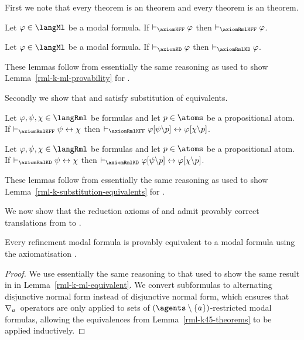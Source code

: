 First we note that every \axiomKFF{} theorem is an \axiomRmlKFF{} theorem and every \axiomKD{} theorem is an \axiomRmlKD{} theorem.

\begin{lemma}\label{rml-k45-ml-provability}
Let $\phi \in \langMl$ be a modal formula.
If $\proves_\axiomKFF \phi$ then $\proves_\axiomRmlKFF \phi$.
\end{lemma}

\begin{lemma}\label{rml-kd45-ml-provability}
Let $\phi \in \langMl$ be a modal formula.
If $\proves_\axiomKD \phi$ then $\proves_\axiomRmlKD \phi$.
\end{lemma}

These lemmas follow from essentially the same reasoning as used to show Lemma~\ref{rml-k-ml-provability} for \axiomRmlK{}.

Secondly we show that \axiomRmlKFF{} and \axiomRmlKD{} satisfy substitution of equivalents.

\begin{lemma}\label{rml-k45-substitution-equivalents}
Let $\phi, \psi, \chi \in \langRml$ be formulas and let $\atomP \in \atoms$ be a propositional atom.
If $\proves_\axiomRmlKFF \psi \iff \chi$ then $\proves_\axiomRmlKFF \phi[\psi\backslash\atomP] \iff \phi[\chi\backslash\atomP]$.
\end{lemma}

\begin{lemma}\label{rml-kd45-substitution-equivalents}
Let $\phi, \psi, \chi \in \langRml$ be formulas and let $\atomP \in \atoms$ be a propositional atom.
If $\proves_\axiomRmlKD \psi \iff \chi$ then $\proves_\axiomRmlKD \phi[\psi\backslash\atomP] \iff \phi[\chi\backslash\atomP]$.
\end{lemma}

These lemmas follow from essentially the same reasoning as used to show Lemma~\ref{rml-k-substitution-equivalents} for \axiomRmlK{}.

We now show that the reduction axioms of \logicRmlKFF{} and \logicRmlKD{} admit provably correct translations from \langRml{} to \langMl{}.

\begin{lemma}\label{rml-k45-ml-equivalent}
Every refinement modal formula is provably equivalent to a modal formula using the axiomatisation \axiomRmlKFF{}.
\end{lemma}

\begin{proof}
We use essentially the same reasoning to that used to show the same result in \axiomRmlK{} in Lemma~\ref{rml-k-ml-equivalent}.
We convert subformulas to alternating disjunctive normal form instead of disjunctive normal form, which ensures that $\nabla_{a}$~operators are only applied to sets of $(\agents \setminus \{\agentA\})$-restricted modal formulas, allowing the equivalences from Lemma~\ref{rml-k45-theorems} to be applied inductively.
\end{proof}

